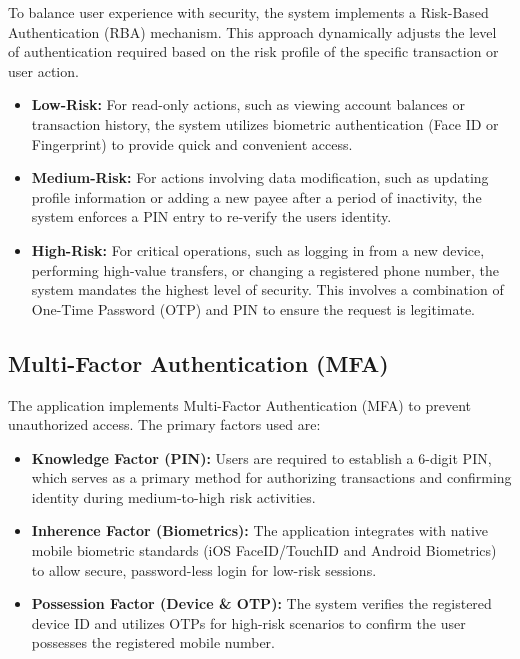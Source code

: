 \documentclass[12pt,oneside,openright,a4paper]{cpe-english-project}
\begin{document}
To balance user experience with security, the system implements a
Risk-Based Authentication (RBA) mechanism. This approach dynamically
adjusts the level of authentication required based on the risk profile
of the specific transaction or user action.

\begin{itemize}
\item
  \textbf{Low-Risk:} For read-only actions, such as viewing account
  balances or transaction history, the system utilizes biometric
  authentication (Face ID or Fingerprint) to provide quick and
  convenient access.
\item
  \textbf{Medium-Risk:} For actions involving data modification, such as
  updating profile information or adding a new payee after a period of
  inactivity, the system enforces a PIN entry to re-verify the
  user\textquotesingle s identity.
\item
  \textbf{High-Risk:} For critical operations, such as logging in from a
  new device, performing high-value transfers, or changing a registered
  phone number, the system mandates the highest level of security. This
  involves a combination of One-Time Password (OTP) and PIN to ensure
  the request is legitimate.
\end{itemize}

\subsection{Multi-Factor Authentication (MFA)}

The application implements Multi-Factor Authentication (MFA) to prevent
unauthorized access. The primary factors used are:

\begin{itemize}
\item
  \textbf{Knowledge Factor (PIN):} Users are required to establish a
  6-digit PIN, which serves as a primary method for authorizing
  transactions and confirming identity during medium-to-high risk
  activities.
\item
  \textbf{Inherence Factor (Biometrics):} The application integrates
  with native mobile biometric standards (iOS FaceID/TouchID and Android
  Biometrics) to allow secure, password-less login for low-risk
  sessions.
\item
  \textbf{Possession Factor (Device \& OTP):} The system verifies the
  registered device ID and utilizes OTPs for high-risk scenarios to
  confirm the user possesses the registered mobile number.
\end{itemize}
\end{document}
